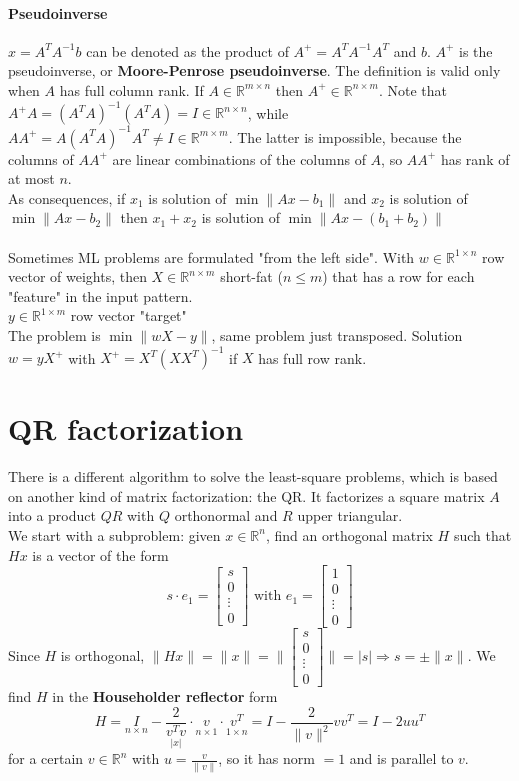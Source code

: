 \documentclass[10pt]{report}
\begin{document}
\paragraph{Pseudoinverse} $x = A^TA^{-1}b$ can be denoted as the product of $A^+ = A^TA^{-1}A^T$ and $b$. $A^+$ is the pseudoinverse, or \textbf{Moore-Penrose pseudoinverse}. The definition is valid only when $A$ has full column rank. If $A\in \mathbb{R}^{m\times n}$ then $A^+ \in \mathbb{R}^{n\times m}$. Note that $A^+A = (A^TA)^{-1}(A^TA) = I\in \mathbb{R}^{n\times n}$, while $AA^+ = A(A^TA)^{-1}A^T \neq I\in \mathbb{R}^{m\times m}$. The latter is impossible, because the columns of $AA^+$ are linear combinations of the columns of $A$, so $AA^+$ has rank of at most $n$.\\
As consequences, if $x_1$ is solution of $\min\|Ax - b_1\|$ and $x_2$ is solution of $\min\|Ax - b_2\|$ then $x_1+x_2$ is solution of $\min\|Ax - (b_1 + b_2)\|$\\\\Sometimes ML problems are formulated "from the left side". With $w\in \mathbb{R}^{1\times n}$ row vector of weights, then $X\in \mathbb{R}^{n\times m}$ short-fat ($n\leq m$) that has a row for each "feature" in the input pattern.\\
$y \in \mathbb{R}^{1\times m}$ row vector "target"\\
The problem is $\min\|wX - y\|$, same problem just transposed. Solution $w = yX^+$ with $X^+ = X^T(XX^T)^{-1}$ if $X$ has full row rank.
\pagebreak
\section{QR factorization}
There is a different algorithm to solve the least-square problems, which is based on another kind of matrix factorization: the QR. It factorizes a square matrix $A$ into a product $QR$ with $Q$ orthonormal and $R$ upper triangular.\\
We start with a subproblem: given $x\in \mathbb{R}^n$, find an orthogonal matrix $H$ such that $Hx$ is a vector of the form $$s\cdot e_1 = \left[\begin{array}{c}
s\\0\\\vdots\\0
\end{array}\right]\text{ with }e_1 = \left[\begin{array}{c}
1\\0\\\vdots\\0
\end{array}\right]$$
Since $H$ is orthogonal, $\|Hx\| = \|x\| = \|\left[\begin{array}{c}
s\\0\\\vdots\\0
\end{array}\right]\| = |s| \Rightarrow s = \pm\|x\|$. We find $H$ in the \textbf{Householder reflector} form $$H = \underset{n\times n}{I} - \underset{|x|}{\frac{2}{v^Tv}}\cdot\underset{n\times 1}{v}\cdot\underset{1\times n}{v^T}= I - \frac{2}{\|v\|^2}vv^T = I - 2uu^T$$ for a certain $v\in \mathbb{R}^n$ with $u = \frac{v}{\|v\|}$, so it has norm $=1$ and is parallel to $v$.
\end{document}
